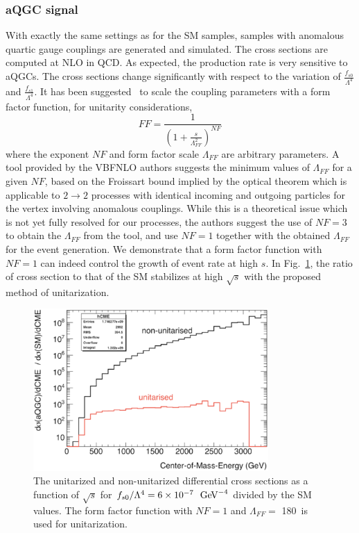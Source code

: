 \subsubsection{aQGC signal}
With exactly the same settings as for the SM samples, samples with
anomalous quartic gauge couplings are generated and simulated.  The
cross sections are computed at NLO in QCD. As expected, the production
rate is very sensitive to aQGCs. The cross sections change
significantly with respect to the variation of
$\frac{f_{s0}}{\Lambda^4}$ and $\frac{f_{s1}}{\Lambda^4}$. It has been
suggested~\cite{aQGC:Twiki} to scale the coupling parameters with a form factor
function, for unitarity considerations,
\[
FF = \frac{1}{\left(1 + \frac{s}{\Lambda_{FF}^2}\right)^{NF}}
\]
where the exponent $NF$ and form factor scale $\Lambda_{FF}$ are
arbitrary parameters.  A tool provided by the {\sc
  VBFNLO} authors suggests the minimum values of $\Lambda_{FF}$
for a given $NF$, based on the Froissart bound implied by the optical
theorem which is applicable to $2\rightarrow 2$ processes with
identical incoming and outgoing particles for the vertex involving
anomalous couplings.  While this is a theoretical issue which is not
yet fully resolved for our processes, the authors suggest the use of $NF =
3$ to obtain the $\Lambda_{FF}$ from the tool, and use $NF = 1$
together with the obtained $\Lambda_{FF}$ for the event generation.
We demonstrate that a form factor function with $NF=1$ can indeed
control the growth of event rate at high $s$. In
Fig.~\ref{fig:unitaritycheck}, the ratio of cross section to that of
the SM stabilizes at high $\sqrt{s}$ with the proposed method of
unitarization.
\begin{figure}[htp]
  \centering
  \includegraphics[width=0.8\textwidth]{figures/signal_section/Unitarity_check.eps}  
  \caption{The unitarized and non-unitarized differential cross
    sections as a function of $\sqrt{s}$ for $f_{s0}/\Lambda^4
    = 6\times 10^{-7}~\GeV^{-4}$ divided by the SM values. The
    form factor function with $NF=1$ and $\Lambda_{FF} =$ 180~\GeV is
    used for unitarization.  }
\label{fig:unitaritycheck}
\end{figure}
